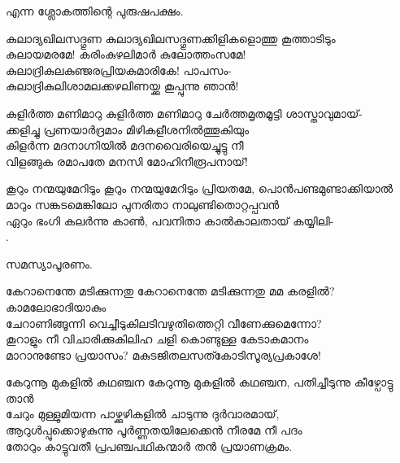 \begin{enumerate}

 എന്ന ശ്ലോകത്തിന്റെ പുരുഷപക്ഷം.  

\begin{slokam}{\VPv}{\Kund}{കുലാദ്യഖിലസദ്ഗുണ}
കുലാദ്യഖിലസദ്ഗുണക്കിളികളൊത്തു കൂത്താടിടും \\
കുലായമരമേ! കരിംകുഴലിമാർ കുലോത്തംസമേ! \\
കുലാദ്രികുലകുഞ്ജരപ്രിയകുമാരികേ! പാപസം-\\
കുലാദ്രികുലിശാമലക്കഴലിണയ്ക്കു കൂപ്പുന്നു ഞാൻ! 
\end{slokam}


\begin{slokam}{\VPv}{\RV}{കുളിർത്ത മണിമാറു}
കുളിർത്ത മണിമാറു ചേർത്തമൃതമൂട്ടി ശാസ്താവുമായ്‌-\\
ക്കളിച്ചു പ്രണയാർദ്രമാം മിഴികളീശനിൽത്തൂകിയും\\
കിളർന്ന മദനാഗ്നിയിൽ മദനവൈരിയെച്ചുട്ടു നീ\\
വിളങ്ങുക രമാപതേ മനസി മോഹിനീരൂപനായ്‌!
\end{slokam}


\begin{slokam}{\VSv}{\Unk}{കൂറും നന്മയുമേറിടും}
കൂറും നന്മയുമേറിടും പ്രിയതമേ, പൊന്‍പണ്ടമുണ്ടാക്കിയാല്‍\\
മാറും സങ്കടമെങ്കിലോ പുനരിതാ നാലുണ്ടിതൊറ്റപ്പവന്‍\\
ഏറും ഭംഗി കലര്‍ന്നു കാണ്‍, പവനിതാ കാല്‍കാലതായ്‌ കയ്യിലി-\\
.
\end{slokam}



സമസ്യാപൂരണം. 



\begin{slokam}{\VSr}{\VNM}{കേറാനെന്തേ മടിക്കുന്നതു}
കേറാനെന്തേ മടിക്കുന്നതു മമ കരളിൽ? കാമലോഭാദിയാകും\\
ചേറാണിങ്ങൂന്നി വെച്ചീടുകിലടിവഴുതിത്തെറ്റി വീണേക്കുമെന്നോ?\\
കൂറാളും നീ വിചാരിക്കുകിലിഹ ചളി കൊണ്ടുള്ള കേടാകമാനം\\
മാറാനുണ്ടോ പ്രയാസം? മകുടജിതലസത്കോടിസൂര്യപ്രകാശേ!
\end{slokam}


\begin{slokam}{\VSv}{\VNM}{കേറുന്നൂ മുകളിൽ കഥഞ്ചന}
കേറുന്നൂ മുകളിൽ കഥഞ്ചന, പതിച്ചീടുന്നു കീഴ്പോട്ടു താൻ\\
ചേറും മുള്ളുമിയന്ന പാഴ്ക്കുഴികളിൽ ചാടുന്നു ദുർവാരമായ്,\\
ആറുൾപ്പുക്കൊഴുകുന്നു പൂർണ്ണതയിലേക്കെൻ നീരമേ നീ പദം\\
തോറും കാട്ടുവതീ പ്രപഞ്ചപഥികന്മാർ തൻ പ്രയാണക്രമം. 
\end{slokam}


\end{enumerate}
